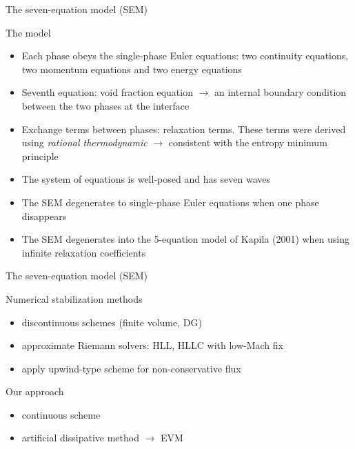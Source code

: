\documentclass[xcolor=dvipsnames,10pt]{beamer}
\newcommand{\tcr}[1]{\textcolor{red}{#1}}
\begin{document}
\begin{frame}{The seven-equation model (SEM)}
\begin{block}{The model}
\begin{itemize}
\setlength{\itemsep}{10pt}
\item Each phase obeys the single-phase Euler equations: two continuity equations, two momentum equations and two energy equations
\item Seventh equation: void fraction equation $\rightarrow$ an internal boundary condition between the two phases at the interface
\item Exchange terms between phases: relaxation terms. These terms were derived using \emph{rational thermodynamic} $\rightarrow$ consistent with the entropy minimum principle
\item {\color{red}The system of equations is well-posed and has seven waves}
\item The SEM degenerates to single-phase Euler equations when one phase disappears
\item The SEM degenerates into the 5-equation model of Kapila (2001) when using infinite relaxation coefficients
\end{itemize}
\end{block}
\end{frame}
\begin{frame}{The seven-equation model (SEM)}
\begin{block}{Numerical stabilization methods}
\begin{itemize}
\setlength{\itemsep}{10pt}
\item discontinuous schemes (finite volume, DG)
\item approximate Riemann solvers: HLL, HLLC with low-Mach fix
\item apply upwind-type scheme for non-conservative flux
\end{itemize}
\end{block}
\begin{block}{Our approach}
\begin{itemize}
\setlength{\itemsep}{10pt}
\item continuous scheme
\item artificial dissipative method $\longrightarrow$ EVM
\end{itemize}
\end{block}
\end{frame}
\end{document}
